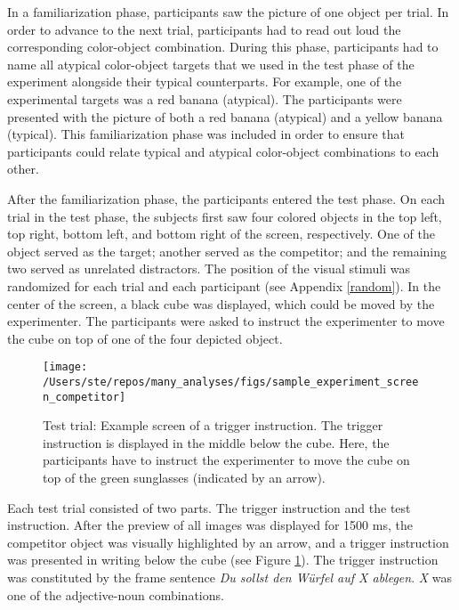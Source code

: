 \documentclass[
  12pt,
]{article}
\begin{document}
In a familiarization phase, participants saw the picture of one object per trial.
In order to advance to the next trial, participants had to read out loud the corresponding color-object combination.
During this phase, participants had to name all atypical color-object targets that we used in the test phase of the experiment alongside their typical counterparts.
For example, one of the experimental targets was a red banana (atypical).
The participants were presented with the picture of both a red banana (atypical) and a yellow banana (typical).
This familiarization phase was included in order to ensure that participants could relate typical and atypical color-object combinations to each other.

After the familiarization phase, the participants entered the test phase.
On each trial in the test phase, the subjects first saw four colored objects in the top left, top right, bottom left, and bottom right of the screen, respectively.
One of the object served as the target; another served as the competitor; and the remaining two served as unrelated distractors.
The position of the visual stimuli was randomized for each trial and each participant (see Appendix \ref{random}).
In the center of the screen, a black cube was displayed, which could be moved by the experimenter.
The participants were asked to instruct the experimenter to move the cube on top of one of the four depicted object.

\begin{figure}[tbp]

{\centering \texttt{[image: /Users/ste/repos/many\_analyses/figs/sample\_experiment\_screen\_competitor]} 

}

\caption{Test trial: Example screen of a trigger instruction. The trigger instruction is displayed in the middle below the cube. Here, the participants have to instruct the experimenter to move the cube on top of the green sunglasses (indicated by an arrow).}\label{fig:image1}
\end{figure}

Each test trial consisted of two parts.
The trigger instruction and the test instruction.
After the preview of all images was displayed for 1500 ms, the competitor object was visually highlighted by an arrow, and a trigger instruction was presented in writing below the cube (see Figure \ref{fig:image1}).
The trigger instruction was constituted by the frame sentence \emph{Du sollst den Würfel auf X ablegen}.
\emph{X} was one of the adjective-noun combinations.
\end{document}
